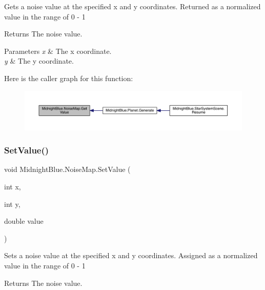 Gets a noise value at the specified x and y coordinates. Returned as a normalized value in the range of 0 -\/ 1 

\begin{DoxyReturn}{Returns}
The noise value.
\end{DoxyReturn}

\begin{DoxyParams}{Parameters}
{\em x} & The x coordinate.\\
\hline
{\em y} & The y coordinate.\\
\hline
\end{DoxyParams}
Here is the caller graph for this function\+:
\nopagebreak
\begin{figure}[H]
\begin{center}
\leavevmode
\includegraphics[width=350pt]{class_midnight_blue_1_1_noise_map_a70d9e8d99e157143eb3d1dbc3895cb9a_icgraph}
\end{center}
\end{figure}
\hypertarget{class_midnight_blue_1_1_noise_map_a26d94cbea4c0377833bed064cbd36496}{}\label{class_midnight_blue_1_1_noise_map_a26d94cbea4c0377833bed064cbd36496} 
\subsubsection{\texorpdfstring{Set\+Value()}{SetValue()}}
{\footnotesize\ttfamily void Midnight\+Blue.\+Noise\+Map.\+Set\+Value (\begin{DoxyParamCaption}\item[{int}]{x,  }\item[{int}]{y,  }\item[{double}]{value }\end{DoxyParamCaption})\hspace{0.3cm}{\ttfamily [inline]}}



Sets a noise value at the specified x and y coordinates. Assigned as a normalized value in the range of 0 -\/ 1 

\begin{DoxyReturn}{Returns}
The noise value.
\end{DoxyReturn}

